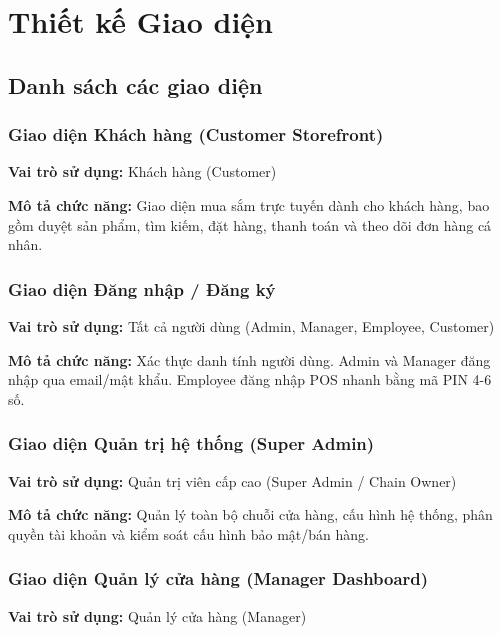 \documentclass[12pt,a4paper]{report}
\begin{document}
\section{Thiết kế Giao diện}

\subsection{Danh sách các giao diện}

\subsubsection{Giao diện Khách hàng (Customer Storefront)}

\textbf{Vai trò sử dụng:} Khách hàng (Customer)

\textbf{Mô tả chức năng:} Giao diện mua sắm trực tuyến dành cho khách hàng, bao gồm duyệt sản phẩm, tìm kiếm, đặt hàng, thanh toán và theo dõi đơn hàng cá nhân.

\subsubsection{Giao diện Đăng nhập / Đăng ký}

\textbf{Vai trò sử dụng:} Tất cả người dùng (Admin, Manager, Employee, Customer)

\textbf{Mô tả chức năng:} Xác thực danh tính người dùng. Admin và Manager đăng nhập qua email/mật khẩu. Employee đăng nhập POS nhanh bằng mã PIN 4-6 số.

\subsubsection{Giao diện Quản trị hệ thống (Super Admin)}

\textbf{Vai trò sử dụng:} Quản trị viên cấp cao (Super Admin / Chain Owner)

\textbf{Mô tả chức năng:} Quản lý toàn bộ chuỗi cửa hàng, cấu hình hệ thống, phân quyền tài khoản và kiểm soát cấu hình bảo mật/bán hàng.

\subsubsection{Giao diện Quản lý cửa hàng (Manager Dashboard)}

\textbf{Vai trò sử dụng:} Quản lý cửa hàng (Manager)
\end{document}

